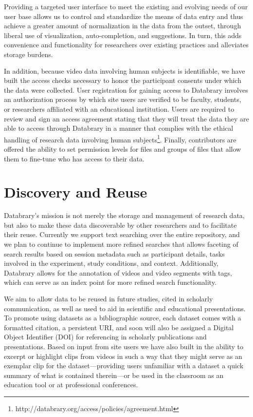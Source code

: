 \documentclass{sig-alternate-2013}
\begin{document}
Providing a targeted user interface to meet the existing and evolving needs of our user base allows us to control and standardize the means of data entry and thus achieve a greater amount of normalization in the data from the outset, through liberal use of visualization, auto-completion, and suggestions.
In turn, this adds convenience and functionality for researchers over existing practices and alleviates storage burdens.

In addition, because video data involving human subjects is identifiable, we have built the access checks necessary to honor the participant consents under which the data were collected. 
User registration for gaining access to Databrary involves an authorization process by which site users are verified to be faculty, students, or researchers affiliated with an educational institution.
Users are required to review and sign an access agreement stating that they will treat the data they are able to access through Databrary in a manner that complies with the ethical handling of research data involving human subjects\footnote{http://databrary.org/access/policies/agreement.html}.
Finally, contributors are offered the ability to set permission levels for files and groups of files that allow them to fine-tune who has access to their data. 

\section{Discovery and Reuse}

Databrary's mission is not merely the storage and management of research data, but also to make these data discoverable by other researchers and to facilitate their reuse.
Currently we support text searching over the entire repository, and we plan to continue to implement more refined searches that allows faceting of search results based on session metadata such as participant details, tasks involved in the experiment, study conditions, and context.
Additionally, Databrary allows for the annotation of videos and video segments with tags, which can serve as an index point for more refined search functionality.  

We aim to allow data to be reused in future studies, cited in scholarly communication, as well as used to aid in scientific and educational presentations.
To promote using datasets as a bibliographic source, each dataset comes with a formatted citation, a persistent URI, and soon will also be assigned a Digital Object Identifier (DOI) for referencing in scholarly publications and presentations.
Based on input from site users we have also built in the ability to excerpt or highlight clips from videos in such a way that they might serve as an exemplar clip for the dataset---providing users unfamiliar with a dataset a quick summary of what is contained therein---or be used in the classroom as an education tool or at professional conferences.
\end{document}
